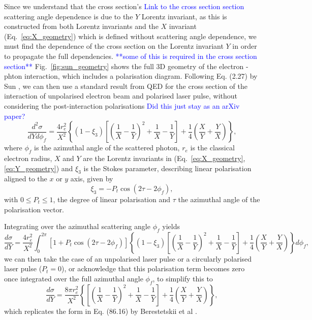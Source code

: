 \documentclass[../main.tex]{subfiles}
\begin{document}
Since we understand that the cross section's \textcolor{blue}{Link to the cross section section} scattering angle dependence is due to the $Y$ Lorentz invariant, as this is constructed from both Lorentz invariants and the $X$ invariant (Eq.~\ref{eq:X_geometry}) which is defined without scattering angle dependence, we must find the dependence of the cross section on the Lorentz invariant $Y$ in order to propagate the full dependencies. \textcolor{blue}{**some of this is required in the cross section section**} Fig.~\ref{fig:sun_geometry} shows the full 3D geometry of the electron - phton interaction, which includes a polarisation diagram. Following Eq. (2.27) by Sun \cite{sun2009characterizations}, we can then use a standard result from QED for the cross section of the interaction of unpolarised electron beam and polarised laser pulse, without considering the post-interaction polarisations \cite{grozin2002complete} \textcolor{blue}{Did this just stay as an arXiv paper?}
\begin{equation}
\frac{d^{2}\sigma}{dYd\phi_{f}} = \frac{4r_{e}^{2}}{X^{2}}\left\{\left(1-\xi_{3}\right)\left[\left(\frac{1}{X}-\frac{1}{Y}\right)^{2}+\frac{1}{X}-\frac{1}{Y}\right]+\frac{1}{4}\left(\frac{X}{Y}+\frac{Y}{X}\right)\right\},
\label{eq:differential_cross_section_Y_phif}
\end{equation}
where $\phi_{f}$ is the azimuthal angle of the scattered photon, $r_{e}$ is the classical electron radius, $X$ and $Y$ are the Lorentz invariants in (Eq.~\ref{eq:X_geometry}, \ref{eq:Y_geometry}) and $\xi_{3}$ is the Stokes parameter, describing linear polarisation aligned to the $x$ or $y$ axis, given by
\begin{equation}
\xi_{3} = -P_{t}\cos\left(2\tau-2\phi_{f}\right),
\label{eq:stokes_3}
\end{equation} 
with $0 \leq P_{t} \leq 1$, the degree of linear polarisation and $\tau$ the azimuthal angle of the polarisation vector. 

Integrating over the azimuthal scattering angle $\phi_{f}$ yields
\begin{equation}
\frac{d\sigma}{dY} = \frac{4r_{e}^{2}}{X^{2}}\int_{0}^{2\pi}\left[1+P_{t}\cos\left(2\tau-2\phi_{f}\right)\right]\left\{\left(1-\xi_{3}\right)\left[\left(\frac{1}{X}-\frac{1}{Y}\right)^{2}+\frac{1}{X}-\frac{1}{Y}\right]+\frac{1}{4}\left(\frac{X}{Y}+\frac{Y}{X}\right)\right\} d\phi_{f}, 
\label{eq:phif_integral}
\end{equation}
we can then take the case of an unpolarised laser pulse or a circularly polarised laser pulse ($P_{t} = 0$), or acknowledge that this polarisation term becomes zero once integrated over the full azimuthal angle $\phi_{f}$, to simplify this to
\begin{equation}
\frac{d\sigma}{dY} = \frac{8\pi r_{e}^{2}}{X^{2}}\left\{\left[\left(\frac{1}{X}-\frac{1}{Y}\right)^{2}+\frac{1}{X}-\frac{1}{Y}\right]+\frac{1}{4}\left(\frac{X}{Y}+\frac{Y}{X}\right)\right\},
\label{eq:cross_section_Y_berestetskii_form}
\end{equation}
which replicates the form in Eq. (86.16) by Berestetskii et al \cite{berestetskii1982quantum}.
\end{document}
